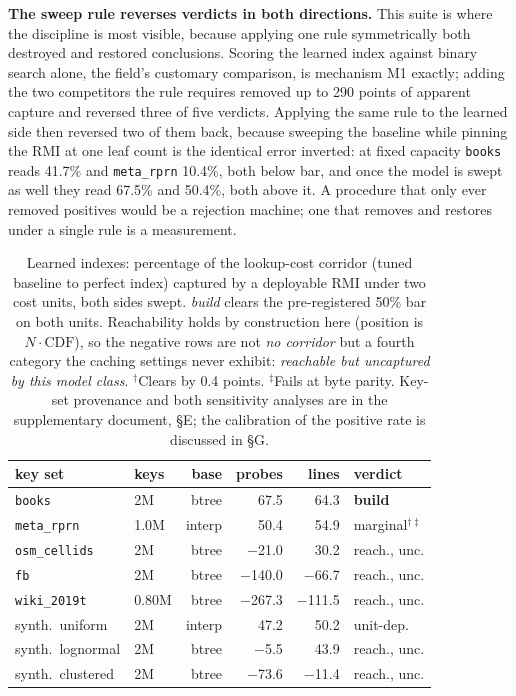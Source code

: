 \documentclass[letterpaper]{article} %
\begin{document}
\textbf{The sweep rule reverses verdicts in both directions.} This suite is where the discipline is most visible, because applying one rule symmetrically both destroyed and restored conclusions. Scoring the learned index against binary search alone, the field's customary comparison, is mechanism M1 exactly; adding the two competitors the rule requires removed up to 290 points of apparent capture and reversed three of five verdicts. Applying the same rule to the learned side then reversed two of them back, because sweeping the baseline while pinning the RMI at one leaf count is the identical error inverted: at fixed capacity \texttt{books} reads 41.7\% and \texttt{meta\_rprn} 10.4\%, both below bar, and once the model is swept as well they read 67.5\% and 50.4\%, both above it. A procedure that only ever removed positives would be a rejection machine; one that removes and restores under a single rule is a measurement.


\begin{table}[t]
\centering\footnotesize
\setlength{\tabcolsep}{2pt}
\begin{tabular}{llrrrl}
\toprule
key set & keys & base & probes & lines & verdict \\
\midrule
\texttt{books} & 2M & btree & 67.5 & 64.3 & \textbf{build} \\
\texttt{meta\_rprn} & 1.0M & interp & 50.4 & 54.9 & marginal$^{\dagger\ddagger}$ \\
\texttt{osm\_cellids} & 2M & btree & $-$21.0 & 30.2 & reach., unc. \\
\texttt{fb} & 2M & btree & $-$140.0 & $-$66.7 & reach., unc. \\
\texttt{wiki\_2019t} & 0.80M & btree & $-$267.3 & $-$111.5 & reach., unc. \\
\midrule
synth.\ uniform & 2M & interp & 47.2 & 50.2 & unit-dep. \\
synth.\ lognormal & 2M & btree & $-$5.5 & 43.9 & reach., unc. \\
synth.\ clustered & 2M & btree & $-$73.6 & $-$11.4 & reach., unc. \\
\bottomrule
\end{tabular}
\caption{Learned indexes: percentage of the lookup-cost corridor (tuned baseline to perfect index) captured by a deployable RMI under two cost units, both sides swept. \emph{build} clears the pre-registered 50\% bar on both units. Reachability holds by construction here (position is $N\cdot\mathrm{CDF}$), so the negative rows are not \emph{no corridor} but a fourth category the caching settings never exhibit: \emph{reachable but uncaptured by this model class}. $^\dagger$Clears by 0.4 points. $^\ddagger$Fails at byte parity. Key-set provenance and both sensitivity analyses are in the supplementary document, \S E; the calibration of the positive rate is discussed in \S G.}
\label{tab:index}
\end{table}
\end{document}
